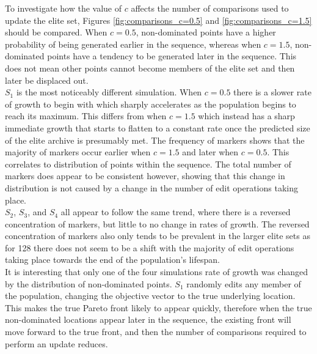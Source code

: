 \documentclass{ecmm427_assignment}
\begin{document}
To investigate how the value of $c$ affects the number of comparisons used to update the elite set, Figures \ref{fig:comparisons_c=0.5} and \ref{fig:comparisons_c=1.5} should be compared. When $c=0.5$, non-dominated points have a higher probability of being generated earlier in the sequence, whereas when $c=1.5$, non-dominated points have a tendency to be generated later in the sequence. This does not mean other points cannot become members of the elite set and then later be displaced out.\\
$S_1$ is the most noticeably different simulation. When $c=0.5$ there is a slower rate of growth to begin with which sharply accelerates as the population begins to reach its maximum. This differs from when $c=1.5$ which instead has a sharp immediate growth that starts to flatten to a constant rate once the predicted size of the elite archive is presumably met. The frequency of markers shows that the majority of markers occur earlier when $c=1.5$ and later when $c=0.5$. This correlates to distribution of points within the sequence. The total number of markers does appear to be consistent however, showing that this change in distribution is not caused by a change in the number of edit operations taking place.\\
$S_2$, $S_3$, and $S_4$ all appear to follow the same trend, where there is a reversed concentration of markers, but little to no change in rates of growth. The reversed concentration of markers also only tends to be prevalent in the larger elite sets as for 128 there does not seem to be a shift with the majority of edit operations taking place towards the end of the population's lifespan.\\
It is interesting that only one of the four simulations rate of growth was changed by the distribution of non-dominated points. $S_1$ randomly edits any member of the population, changing the objective vector to the true underlying location. This makes the true Pareto front likely to appear quickly, therefore when the true non-dominated locations appear later in the sequence, the existing front will move forward to the true front, and then the number of comparisons required to perform an update reduces.
\end{document}
